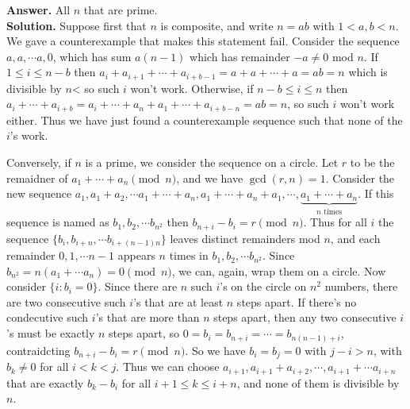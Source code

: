\documentclass[11pt,a4paper]{article}
\begin{document}
\begin{enumerate}
    \textbf{Answer.} All $n$ that are prime. \\
    \textbf{Solution.} Suppose first that $n$ is composite, and write $n=ab$ with $1<a, b<n$. We gave a counterexample that makes this statement fail. Consider the sequence $a, a, \cdots a, 0$, which has sum $a(n-1)$ which has remainder $-a\neq 0$ mod $n$. If $1\le i\le n-b$ then $a_i+a_{i+1}+\cdots + a_{i+b-1}=a+a+\cdots + a=ab=n$ which is divisible by $n$< so such $i$ won't work. Otherwise, if $n-b\le i\le n$ then $a_i+\cdots + a_{i+b}=a_i+\cdots + a_n+a_1+\cdots +a_{i + b - n}=ab=n$, so such $i$ won't work either. Thus we have just found a counterexample sequence such that none of the $i$'s work. 
    
    Conversely, if $n$ is a prime, we consider the sequence on a circle. Let $r$ to be the remaidner of $a_1+\cdots +a_n\pmod{n}$, and we have $\gcd(r, n)=1$. Consider the new sequence $a_1, a_1+a_2, \cdots a_1+\cdots +a_n, a_1+\cdots + a_n+a_1, \cdots , \underbrace{a_1+\cdots+a_n}_{\text{$n$ times}}$. If this sequence is named as $b_1, b_2, \cdots b_{n^2}$ then $b_{n+i}-b_i=r\pmod{n}$. Thus for all $i$ the sequence $\{b_i, b_{i+n}, \cdots b_{i + (n-1)n}\}$ leaves distinct remainders mod $n$, and each remainder $0, 1, \cdots n-1$ appears $n$ times in $b_1, b_2, \cdots b_{n^2}$. Since $b_{n^2}=n(a_1+\cdots a_n)=0\pmod{n}$, we can, again, wrap them on a circle. Now consider $\{i:b_i=0\}$. Since there are $n$ such $i$'s on the circle on $n^2$ numbers, there are two consecutive such $i$'s that are at least $n$ steps apart. If there's no condecutive such $i$'s that are more than $n$ steps apart, then any two consecutive $i$'s must be exactly $n$ steps apart, so $0=b_i=b_{n+i}=\cdots=b_{n(n-1)+i}$, contraidcting $b_{n+i}-b_i=r\pmod{n}$. So we have $b_i=b_j=0$ with $j-i>n$, with $b_k\neq 0$ for all $i<k<j$. Thus we can choose $a_{i+1}, a_{i+1}+a_{i+2}, \cdots, a_{i+1}+\cdots a_{i+n}$ that are exactly $b_{k}-b_i$ for all $i+1\le k\le i+n$, and none of them is divisible by $n$. 
	\end{enumerate}
\end{document}
